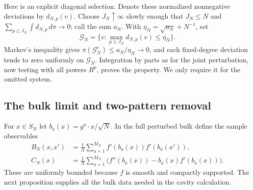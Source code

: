 \documentclass[11pt]{article}
\begin{document}
Here is an explicit diagonal selection. Denote these normalized nonnegative deviations by $d_{N,p}(v)$. Choose $J_N\uparrow\infty$ slowly enough that $J_N\le N$ and
$\sum_{p\le J_N}\int d_{N,p}\,d\pi\to0$; call the sum $a_N$. With $\eta_N=\sqrt{a_N}+N^{-1}$, set
\[
 \mathcal G_N=\{v:\max_{p\le J_N}d_{N,p}(v)\le\eta_N\}.
\]
Markov's inequality gives $\pi(\mathcal G_N^c)\le a_N/\eta_N\to0$, and each fixed-degree deviation tends to zero uniformly on $\mathcal G_N$. Integration by parts as for the joint perturbation, now testing with all powers $R^p$, proves the property. We only require it for the omitted system.

\subsection{The bulk limit and two-pattern removal}

For $x\in S_N$ let $b_a(x)=g^a\cdot x/\sqrt N$. In the full
perturbed bulk define the sample observables
\begin{equation}\label{eq:bulk-observables}
\begin{aligned}
 B_N(x,x')&=\frac1N\sum_{a=1}^{M_N}
                 f'(b_a(x))f'(b_a(x')),\\
 C_N(x)&=\frac1N\sum_{a=1}^{M_N}
             \big(f''(b_a(x))-b_a(x)f'(b_a(x))\big).
\end{aligned}
\end{equation}
These are uniformly bounded because $f$ is smooth and compactly supported.
The next proposition supplies all the bulk data needed in the cavity
calculation.
\end{document}
